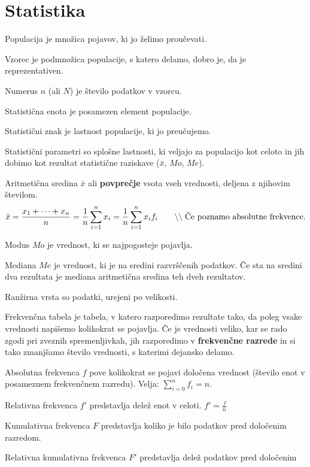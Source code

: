 \documentclass[a4paper,oneside,12pt,fleqn]{article}
\newcommand{\comment}[1]{\ensuremath{\qquad\backslash\backslash\;}\textnormal{#1}}
\numberwithin{equation}{section}
\newenvironment{description*}%
{
\vspace{-12pt}%
\begin{description}%
\setlength{\itemsep}{0pt}%
\setlength{\parskip}{2pt}}%
{\end{description}}
\begin{document}
\section{Statistika}
\label{sec:stat}
\begin{description*}
  \item[Populacija] je množica pojavov, ki jo želimo proučevati.
  \item[Vzorec] je podmnožica populacije, s katero delamo, dobro je, da je
    reprezentativen.
  \item[Numerus $n$] (ali $N$) je število podatkov v vzorcu.
  \item[Statistična enota] je posamezen element populacije.
  \item[Statistični znak] je lastnost populacije, ki jo preučujemo.
  \item[Statistični parametri] so splošne lastnosti, ki veljajo za populacijo kot celoto in jih
    dobimo kot rezultat statistične raziskave ($\bar{x}$, $Mo$, $Me$).
  \item[Aritmetična sredina] $\bar{x}$ ali \textbf{povprečje} vsota vseh vrednosti, deljena z
    njihovim številom.
    \[ \bar{x} = \frac{x_1 + \cdots + x_n}{n} = \frac{1}{n}\sum_{i=1}^nx_i  =
    \frac{1}{n}\sum_{i=1}^nx_if_i \comment{Če poznamo absolutne frekvence.}\]
  \item[Modus $Mo$] je vrednost, ki se najpogosteje pojavlja.
  \item[Mediana $Me$] je vrednost, ki je na sredini razvrščenih podatkov. Če sta na sredini dva
    rezultata je mediana aritmetična sredina teh dveh rezultatov.
  \item[Ranžirna vrsta] so podatki, urejeni po velikosti.
  \item[Frekvenčna tabela] je tabela, v katero razporedimo rezultate tako, da poleg vsake
    vrednosti napišemo kolikokrat se pojavlja. Če je vrednosti veliko, kar se rado zgodi
    pri zveznih spremenljivkah, jih razporedimo v \textbf{frekvenčne razrede} in si tako
    zmanjšamo število vrednosti, s katerimi dejansko delamo.
  \item[Absolutna frekvenca $f$] pove kolikokrat se pojavi določena vrednost (število enot
    v posameznem frekvenčnem razredu). Velja: $\sum_{i=0}^nf_i = n.$
  \item[Relativna frekvenca $f'$] predstavlja delež enot v celoti. $f' = \frac{f}{n}$
  \item[Kumulativna frekvenca $F$] predstavlja koliko je bilo podatkov pred določenim
    razredom.
  \item[Relativna kumulativna frekvenca $F'$] predstavlja delež podatkov pred določenim

\end{description*}
\end{document}
